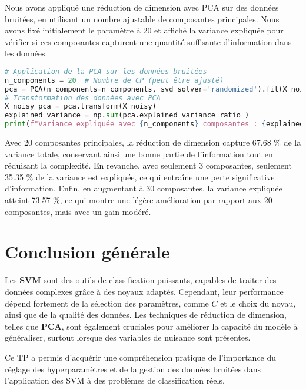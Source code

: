 \documentclass[12pt,a4paper]{report}
\begin{document}
Nous avons appliqué une réduction de dimension avec PCA sur des données bruitées, en utilisant un nombre ajustable de composantes principales. Nous avons fixé initialement le paramètre à 20 et affiché la variance expliquée pour vérifier si ces composantes capturent une quantité suffisante d'information dans les données.

\begin{lstlisting}[language=Python, caption=Application de PCA avec affichage de la variance expliquée]
# Application de la PCA sur les données bruitées
n_components = 20  # Nombre de CP (peut être ajusté)
pca = PCA(n_components=n_components, svd_solver='randomized').fit(X_noisy)
# Transformation des données avec PCA
X_noisy_pca = pca.transform(X_noisy)
explained_variance = np.sum(pca.explained_variance_ratio_)
print(f"Variance expliquée avec {n_components} composantes : {explained_variance:.2%}")
\end{lstlisting}
Avec 20 composantes principales, la réduction de dimension capture 67.68 \% de la variance totale, conservant ainsi une bonne partie de l'information tout en réduisant la complexité. En revanche, avec seulement 3 composantes, seulement 35.35 \% de la variance est expliquée, ce qui entraîne une perte significative d'information. Enfin, en augmentant à 30 composantes, la variance expliquée atteint 73.57 \%, ce qui montre une légère amélioration par rapport aux 20 composantes, mais avec un gain modéré.


\section*{Conclusion générale}

Les \textbf{SVM} sont des outils de classification puissants, capables de traiter des données complexes grâce à des noyaux adaptés. Cependant, leur performance dépend fortement de la sélection des paramètres, comme \( C \) et le choix du noyau, ainsi que de la qualité des données. Les techniques de réduction de dimension, telles que \textbf{PCA}, sont également cruciales pour améliorer la capacité du modèle à généraliser, surtout lorsque des variables de nuisance sont présentes.

Ce TP a permis d'acquérir une compréhension pratique de l'importance du réglage des hyperparamètres et de la gestion des données bruitées dans l'application des SVM à des problèmes de classification réels.
\end{document}
